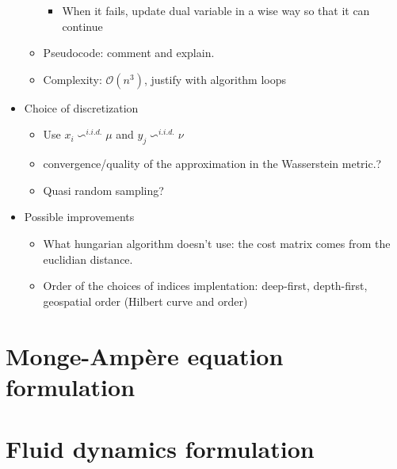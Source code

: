 \documentclass[a4paper]{article}
\theoremstyle{definition}
\theoremstyle{remark}
\begin{document}
\begin{itemize}
\begin{itemize}
\begin{itemize}
            \item When it fails, update dual variable in a wise way so that it can continue  
        \end{itemize}
        \item Pseudocode: comment and explain.
        \item Complexity: $\mathcal{O}(n^3)$, justify with algorithm loops
    \end{itemize}
    \item Choice of discretization
    \begin{itemize}
        \item Use $x_i\backsim^{i.i.d.}\mu$ and  $y_j\backsim^{i.i.d.}\nu$
        \item convergence/quality of the approximation in the Wasserstein metric.?
        \item Quasi random sampling?
    \end{itemize}
    \item Possible improvements
    \begin{itemize}
        \item What hungarian algorithm doesn't use: the cost matrix comes from the euclidian distance.
        \item Order of the choices of indices implentation: deep-first, depth-first, geospatial order (Hilbert curve and order) 
    \end{itemize}
\end{itemize}

\section{Monge-Ampère equation formulation}
\section{Fluid dynamics formulation}
\end{document}
